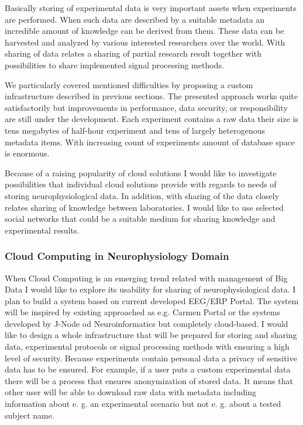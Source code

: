 \documentclass[a4paper, 10pt]{article}
\begin{document}
Basically storing of experimental data is very important assets when experiments are performed. When such data are described by a suitable metadata an incredible amount of knowledge can be derived from them. These data can be harvested and analyzed by various interested researchers over the world. With sharing of data relates a sharing of partial research result together with possibilities to share implemented signal processing methods.

We particularly covered mentioned difficulties by proposing a custom infrastructure described in previous sections. The presented approach works quite satisfactorily but improvements in performance, data security, or responsibility are still under the development. Each experiment contains a raw data their size is tens megabytes of half-hour experiment and tens of largely heterogenous metadata items. With increasing count of experiments amount of database space is enormous.

Because of a raising popularity of cloud solutions I would like to investigate possibilities that individual cloud solutions provide with regards to needs of storing neurophysiological data. In addition, with sharing of the data closely relates sharing of knowledge between laboratories. I would like to use selected social networks that could be a suitable medium for sharing knowledge and experimental results.

\subsubsection*{Cloud Computing in Neurophysiology Domain}

When Cloud Computing is an emerging trend related with management of Big Data I would like to explore its usability for sharing of neurophysiological data. I plan to build a system based on current developed EEG/ERP Portal. The system will be inspired by existing approached as e.g. Carmen Portal or the systems developed by J-Node od Neuroinformatics but completely cloud-based.  I would like to design a whole infrastructure that will be prepared for storing and sharing data, experimental protocols or signal processing methods with ensuring a high level of security. Because experiments contain personal data a privacy of sensitive data has to be ensured. For example, if a user puts a custom experimental data there will be a process that ensures anonymization of stored data. It means that other user will be able to download raw data with metadata including information about e. g. an experimental scenario but not e. g. about a tested subject name.
\end{document}
